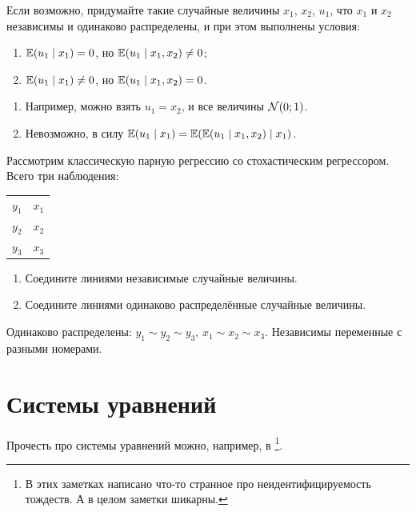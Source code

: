 \begin{problem}
  Если возможно, придумайте такие случайные величины $x_1$, $x_2$, $u_1$, что $x_1$ и $x_2$ независимы и одинаково распределены,
  и при этом выполнены условия:
  \begin{enumerate}
    \item $\operatorname{\mathbb E}(u_1 \mid x_1)=0$, но $\operatorname{\mathbb E}(u_1 \mid x_1, x_2) \neq 0$;
    \item $\operatorname{\mathbb E}(u_1 \mid x_1)\neq 0$, но $\operatorname{\mathbb E}(u_1 \mid x_1, x_2) = 0$.
  \end{enumerate}
\begin{sol}
  \begin{enumerate}
    \item Например, можно взять $u_1=x_2$, и все величины $\mathcal{N}(0;1)$.
    \item Невозможно, в силу $\operatorname{\mathbb E}(u_1 \mid x_1) = \operatorname{\mathbb E}(\operatorname{\mathbb E}(u_1 \mid x_1, x_2) \mid x_1)$.
  \end{enumerate}

  
\end{sol}
\end{problem}

\begin{problem}
 Рассмотрим классическую парную регрессию со стохастическим регрессором. Всего три наблюдения:

 \begin{tabular}{rr}
 \toprule
 $y_1$ & $x_1$ \\
 $y_2$ & $x_2$ \\
 $y_3$ & $x_3$ \\
 \bottomrule
 \end{tabular}

\begin{enumerate}
 \item Соедините линиями независимые случайные величины.
 \item Соедините линиями одинаково распределённые случайные величины.
\end{enumerate}

\begin{sol}
  Одинаково распределены: $y_1 \sim y_2 \sim y_3$, $x_1 \sim x_2 \sim x_3$. Независимы переменные с разными номерами.
\end{sol}
\end{problem}


\section{Системы уравнений}

Прочесть про системы уравнений можно, например, в \cite{pierse2021notes}\footnote{В этих заметках написано что-то странное про неидентифицируемость тождеств. А в целом заметки шикарны.}. 


